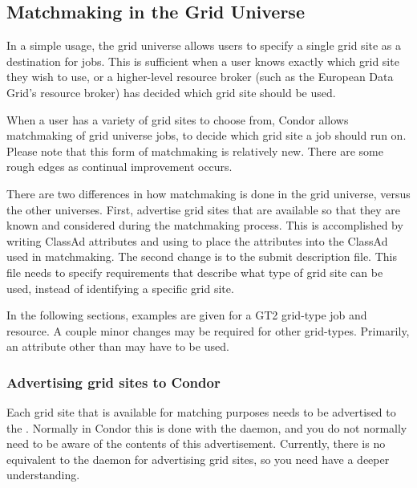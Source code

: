 \subsection{\label{sec:Grid-Matchmaking}Matchmaking in the Grid Universe}

In a simple usage, the grid universe allows users to specify a single
grid site as a destination for jobs.
This is sufficient when a user knows exactly which
grid site they wish to use,
or a higher-level resource broker
(such as the European Data Grid's resource broker)
has decided which grid site should be used.

When a user has a variety of grid sites to choose from,
Condor allows matchmaking of grid universe jobs,
to decide which grid site a job should run on. 
Please note that this form of matchmaking is relatively new.
There are some rough edges as continual improvement occurs.

There are two differences in how matchmaking is done in the grid
universe, versus the other universes.
First,
advertise grid sites that are available so that they are
known and considered during the matchmaking process.
This is accomplished by writing ClassAd attributes and
using  to place the attributes into the
ClassAd used in matchmaking.
The second change is to the
submit description file.
This file needs to specify requirements that describe what
type of grid site can be used, instead of identifying a specific grid site.

In the following sections, examples are given for a GT2 grid-type job and
resource. A couple minor changes may be required for other grid-types.
Primarily, an attribute other than  may have to be
used.

\subsubsection{Advertising grid sites to Condor}

Each grid site that is available for matching purposes needs to be
advertised to the . Normally in Condor this is done
with the  daemon, and you do not normally need to be
aware of the contents of this advertisement. Currently, there is no
equivalent to the  daemon for advertising grid sites,
so you need have a deeper understanding.

